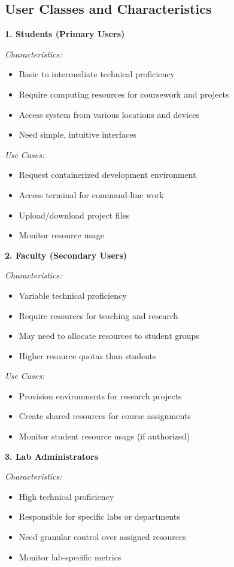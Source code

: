 \documentclass[12pt,a4paper]{article}
\begin{document}
\subsection{User Classes and Characteristics}
\label{sec:users}

\textbf{1. Students (Primary Users)}

\textit{Characteristics:}
\begin{itemize}
    \item Basic to intermediate technical proficiency
    \item Require computing resources for coursework and projects
    \item Access system from various locations and devices
    \item Need simple, intuitive interfaces
\end{itemize}

\textit{Use Cases:}
\begin{itemize}
    \item Request containerized development environment
    \item Access terminal for command-line work
    \item Upload/download project files
    \item Monitor resource usage
\end{itemize}
\textbf{2. Faculty (Secondary Users)}

\textit{Characteristics:}
\begin{itemize}
    \item Variable technical proficiency
    \item Require resources for teaching and research
    \item May need to allocate resources to student groups
    \item Higher resource quotas than students
\end{itemize}

\textit{Use Cases:}
\begin{itemize}
    \item Provision environments for research projects
    \item Create shared resources for course assignments
    \item Monitor student resource usage (if authorized)
\end{itemize}

\textbf{3. Lab Administrators}

\textit{Characteristics:}
\begin{itemize}
    \item High technical proficiency
    \item Responsible for specific labs or departments
    \item Need granular control over assigned resources
    \item Monitor lab-specific metrics
\end{itemize}
\end{document}
